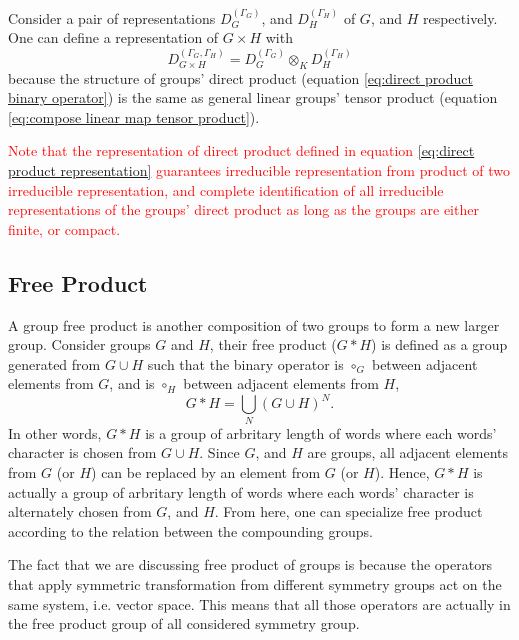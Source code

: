 \documentclass[preprint, 12pt]{revtex4-2}
\numberwithin{equation}{section}
\begin{document}
Consider a pair of representations $D^{(\Gamma_G)}_G$, and $D^{(\Gamma_H)}_H$ of $G$, and $H$ respectively. One can define a representation of $G\times H$ with
\begin{equation}\label{eq:direct product representation}
    D^{(\Gamma_G,\Gamma_H)}_{G\times H} = D^{(\Gamma_G)}_G\otimes_K D^{(\Gamma_H)}_H
\end{equation}
because the structure of groups' direct product (equation \ref{eq:direct product binary operator}) is the same as general linear groups' tensor product (equation \ref{eq:compose linear map tensor product}).

\textcolor{red}{
Note that the representation of direct product defined in equation \ref{eq:direct product representation} guarantees irreducible representation from product of two irreducible representation, and complete identification of all irreducible representations of the groups' direct product as long as the groups are either finite, or compact.}

\subsection{Free Product}
A group free product is another composition of two groups to form a new larger group. Consider groups $G$ and $H$, their free product ($G\ast H$) is defined as a group generated from $G\cup H$ such that the binary operator is $\circ_G$ between adjacent elements from $G$, and is $\circ_H$ between adjacent elements from $H$,
\begin{equation}\label{eq:free product}
    G\ast H = \bigcup_{N}(G\cup H)^N.
\end{equation}
In other words, $G\ast H$ is a group of arbritary length of words where each words' character is chosen from $G\cup H$. Since $G$, and $H$ are groups, all adjacent elements from $G$ (or $H$) can be replaced by an element from $G$ (or $H$). Hence, $G\ast H$ is actually a group of arbritary length of words where each words' character is alternately chosen from $G$, and $H$. From here, one can specialize free product according to the relation between the compounding groups.

The fact that we are discussing free product of groups is because the operators that apply symmetric transformation from different symmetry groups act on the same system, i.e. vector space. This means that all those operators are actually in the free product group of all considered symmetry group.
\end{document}
